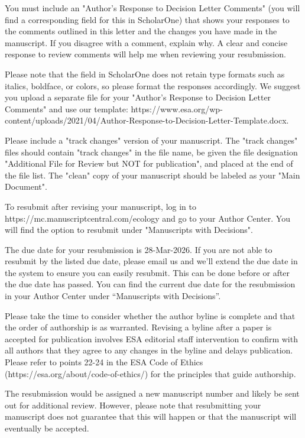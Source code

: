 \documentclass{article}
\begin{document}
You must include an "Author's Response to Decision Letter Comments" (you will find a corresponding field for this in ScholarOne) that shows your responses to the comments outlined in this letter and the changes you have made in the manuscript. If you disagree with a comment, explain why. A clear and concise response to review comments will help me when reviewing your resubmission.

Please note that the field in ScholarOne does not retain type formats such as italics, boldface, or colors, so please format the responses accordingly. We suggest you upload a separate file for your "Author's Response to Decision Letter Comments" and use our template: https://www.esa.org/wp-content/uploads/2021/04/Author-Response-to-Decision-Letter-Template.docx.

Please include a "track changes" version of your manuscript. The "track changes" files should contain "track changes" in the file name, be given the file designation "Additional File for Review but NOT for publication", and placed at the end of the file list. The "clean" copy of your manuscript should be labeled as your "Main Document".

To resubmit after revising your manuscript, log in to https://mc.manuscriptcentral.com/ecology and go to your Author Center. You will find the option to resubmit under "Manuscripts with Decisions".

The due date for your resubmission is 28-Mar-2026. If you are not able to resubmit by the listed due date, please email us and we’ll extend the due date in the system to ensure you can easily resubmit. This can be done before or after the due date has passed. You can find the current due date for the resubmission in your Author Center under “Manuscripts with Decisions”.

Please take the time to consider whether the author byline is complete and that the order of authorship is as warranted. Revising a byline after a paper is accepted for publication involves ESA editorial staff intervention to confirm with all authors that they agree to any changes in the byline and delays publication. Please refer to points 22-24 in the ESA Code of Ethics (https://esa.org/about/code-of-ethics/) for the principles that guide authorship.

The resubmission would be assigned a new manuscript number and likely be sent out for additional review. However, please note that resubmitting your manuscript does not guarantee that this will happen or that the manuscript will eventually be accepted.
\end{document}
